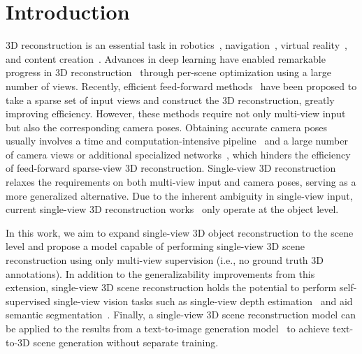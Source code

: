 \documentclass{article} %
\begin{document}
\section{Introduction} 3D reconstruction is an essential task in robotics~\citep{yandun2020visual,han2022scene}, navigation~\citep{davison2003real,kazerouni2022survey}, virtual reality~\citep{bruno20103d}, and content creation~\citep{jun2023shap,tang2023dreamgaussian}. Advances in deep learning have enabled remarkable progress in 3D reconstruction~\citep{sitzmann2019scene,mildenhall2021nerf,truong2023sparf,kerbl20233d} through per-scene optimization using a large number of views. Recently, efficient feed-forward methods~\citep{yu2021pixelnerf,charatan2024pixelsplat} have been proposed to take a sparse set of input views and construct the 3D reconstruction, greatly improving efficiency. However, these methods require not only multi-view input but also the corresponding camera poses. Obtaining accurate camera poses usually involves a time and computation-intensive pipeline~\citep{ullman1979interpretation} and a large number of camera views or additional specialized networks~\citep{kendall2015posenet,yin2018geonet,peng2019pvnet}, which hinders the efficiency of feed-forward sparse-view 3D reconstruction. Single-view 3D reconstruction relaxes the requirements on both multi-view input and camera poses, serving as a more generalized alternative. Due to the inherent ambiguity in single-view input, current single-view 3D reconstruction works~\citep{yu2021pixelnerf,szymanowicz2024splatter} only operate at the object level.

In this work, we aim to expand single-view 3D object reconstruction to the scene level and propose a model capable of performing single-view 3D scene reconstruction using only multi-view supervision (i.e., no ground truth 3D annotations). In addition to the generalizability improvements from this extension, single-view 3D scene reconstruction holds the potential to perform self-supervised single-view vision tasks such as single-view depth estimation~\citep{li2018megadepth} and aid semantic segmentation~\citep{zhang2010semantic,schon2023impact}. Finally, a single-view 3D scene reconstruction model can be applied to the results from a text-to-image generation model~\citep{rombach2022high} to achieve text-to-3D scene generation without separate training.
\end{document}
